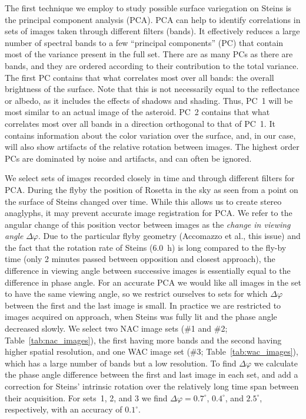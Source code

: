 \documentclass[preprint,3p,authoryear]{elsarticle}
\begin{document}
The first technique we employ to study possible surface variegation on Steins is the principal component analysis (PCA). PCA can help to identify correlations in sets of images taken through different filters (bands). It effectively reduces a large number of spectral bands to a few ``principal components'' (PC) that contain most of the variance present in the full set. There are as many PCs as there are bands, and they are ordered according to their contribution to the total variance. The first PC contains that what correlates most over all bands: the overall brightness of the surface. Note that this is not necessarily equal to the reflectance or albedo, as it includes the effects of shadows and shading. Thus, PC~1 will be most similar to an actual image of the asteroid. PC~2 contains that what correlates most over all bands in a direction orthogonal to that of PC~1. It contains information about the color variation over the surface, and, in our case, will also show artifacts of the relative rotation between images. The highest order PCs are dominated by noise and artifacts, and can often be ignored.

We select sets of images recorded closely in time and through different filters for PCA. During the flyby the position of Rosetta in the sky as seen from a point on the surface of Steins changed over time. While this allows us to create stereo anaglyphs, it may prevent accurate image registration for PCA. We refer to the angular change of this position vector between images as the {\it change in viewing angle} $\Delta \varphi$. Due to the particular flyby geometry (Accomazzo et al., this issue) and the fact that the rotation rate of Steins (6.0~h) is long compared to the fly-by time (only 2 minutes passed between opposition and closest approach), the difference in viewing angle between successive images is essentially equal to the difference in phase angle. For an accurate PCA we would like all images in the set to have the same viewing angle, so we restrict ourselves to sets for which $\Delta \varphi$ between the first and the last image is small. In practice we are restricted to images acquired on approach, when Steins was fully lit and the phase angle decreased slowly. We select two NAC image sets (\#1 and \#2; Table~\ref{tab:nac_images}), the first having more bands and the second having higher spatial resolution, and one WAC image set (\#3; Table~\ref{tab:wac_images}), which has a large number of bands but a low resolution. To find $\Delta \varphi$ we calculate the phase angle difference between the first and last image in each set, and add a correction for Steins' intrinsic rotation over the relatively long time span between their acquisition. For sets~1, 2, and 3 we find $\Delta \varphi = 0.7^\circ$, $0.4^\circ$, and $2.5^\circ$, respectively, with an accuracy of $0.1^\circ$.
\end{document}
